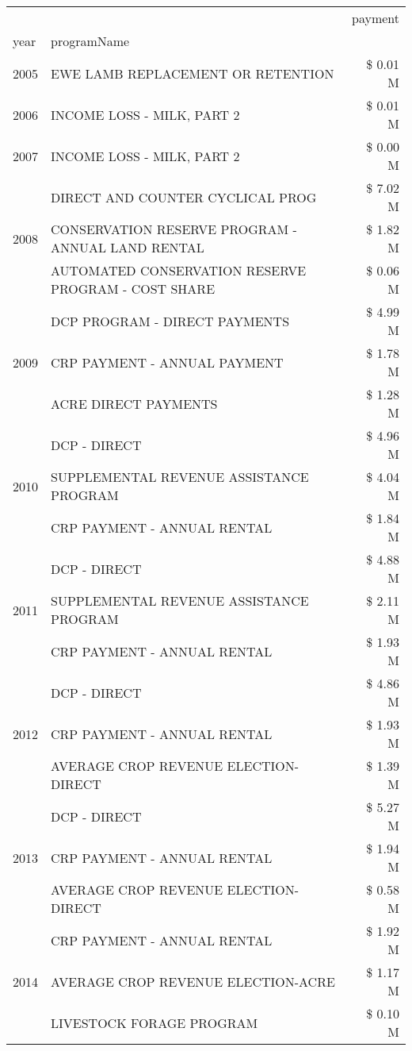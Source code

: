 \begin{tabular}{llr}
\toprule
 &  & payment \\
year & programName &  \\
\midrule
2005 & EWE LAMB REPLACEMENT OR RETENTION & \$ 0.01 M \\
\cline{1-3}
2006 & INCOME LOSS - MILK, PART 2 & \$ 0.01 M \\
\cline{1-3}
2007 & INCOME LOSS - MILK, PART 2 & \$ 0.00 M \\
\cline{1-3}
\multirow[t]{3}{*}{2008} & DIRECT AND COUNTER CYCLICAL PROG & \$ 7.02 M \\
 & CONSERVATION RESERVE PROGRAM - ANNUAL LAND RENTAL & \$ 1.82 M \\
 & AUTOMATED CONSERVATION RESERVE PROGRAM - COST SHARE & \$ 0.06 M \\
\cline{1-3}
\multirow[t]{3}{*}{2009} & DCP PROGRAM - DIRECT PAYMENTS & \$ 4.99 M \\
 & CRP PAYMENT - ANNUAL PAYMENT & \$ 1.78 M \\
 & ACRE DIRECT PAYMENTS & \$ 1.28 M \\
\cline{1-3}
\multirow[t]{3}{*}{2010} & DCP - DIRECT & \$ 4.96 M \\
 & SUPPLEMENTAL REVENUE ASSISTANCE PROGRAM & \$ 4.04 M \\
 & CRP PAYMENT - ANNUAL RENTAL & \$ 1.84 M \\
\cline{1-3}
\multirow[t]{3}{*}{2011} & DCP - DIRECT & \$ 4.88 M \\
 & SUPPLEMENTAL REVENUE ASSISTANCE PROGRAM & \$ 2.11 M \\
 & CRP PAYMENT - ANNUAL RENTAL & \$ 1.93 M \\
\cline{1-3}
\multirow[t]{3}{*}{2012} & DCP - DIRECT & \$ 4.86 M \\
 & CRP PAYMENT - ANNUAL RENTAL & \$ 1.93 M \\
 & AVERAGE CROP REVENUE ELECTION-DIRECT & \$ 1.39 M \\
\cline{1-3}
\multirow[t]{3}{*}{2013} & DCP - DIRECT & \$ 5.27 M \\
 & CRP PAYMENT - ANNUAL RENTAL & \$ 1.94 M \\
 & AVERAGE CROP REVENUE ELECTION-DIRECT & \$ 0.58 M \\
\cline{1-3}
\multirow[t]{3}{*}{2014} & CRP PAYMENT - ANNUAL RENTAL & \$ 1.92 M \\
 & AVERAGE CROP REVENUE ELECTION-ACRE & \$ 1.17 M \\
 & LIVESTOCK FORAGE PROGRAM & \$ 0.10 M \\
\cline{1-3}

\end{tabular}
